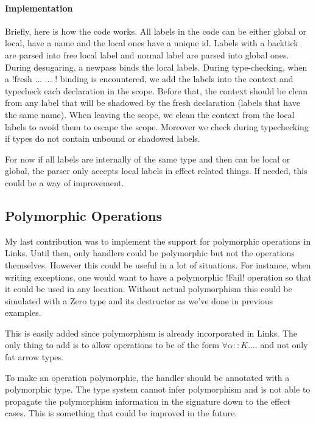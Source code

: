 \documentclass[11pt, nonacm=true, language=french, language=english]{acmart}
\begin{document}
\paragraph{Implementation}
Briefly, here is how the code works. All labels in the code can be either global or local, have a name and the local ones have a unique id. Labels with a backtick are parsed into free local label and normal label are parsed into global ones. During desugaring, a newpass binds the local labels. During type-checking, when a !fresh ... { ... }! binding is encountered, we add the labels into the context and typecheck each declaration in the scope. Before that, the context should be clean from any label that will be shadowed by the fresh declaration (labels that have the same name). When leaving the scope, we clean the context from the local labels to avoid them to escape the scope. Moreover we check during typechecking if types do not contain unbound or shadowed labels.

\begin{rem}
  For now if all labels are internally of the same type and then can be local or global, the parser only accepts local labels in effect related things. If needed, this could be a way of improvement.
\end{rem}


\subsection{Polymorphic Operations}
\label{sec:poly-op}

My last contribution was to implement the support for polymorphic operations in Links. Until then, only handlers could be polymorphic but not the operations themselves. However this could be useful in a lot of situations. For instance, when writing exceptions, one would want to have a polymorphic !Fail! operation so that it could be used in any location. Without actual polymorphism this could be simulated with a Zero type and its destructor as we've done in previous examples.

This is easily added since polymorphism is already incorporated in Links. The only thing to add is to allow operations to be of the form $\forall \alpha ::K. \dots$ and not only fat arrow types.

To make an operation polymorphic, the handler should be annotated with a polymorphic type. The type system cannot infer polymorphism and is not able to propagate the polymorphism information in the signature down to the effect cases. This is something that could be improved in the future.
\end{document}
